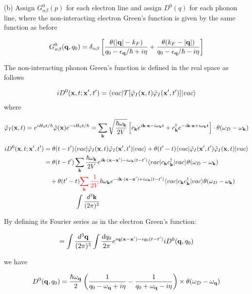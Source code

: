 \noindent (b) Assign $G_{\alpha\beta}^0(p)$ for each electron line and assign $D^0(q)$ for each phonon line, where the non-interacting electron Green's function is given by the same function as before

\[G_{\alpha\beta}^0({\bf q},q_0) = \delta_{\alpha\beta}\left[\frac{\theta(|{\bf q}|-k_F)}{q_0-\epsilon_{\bf q}/\hbar+i\eta} + \frac{\theta(k_F - |{\bf q}|)}{q_0-\epsilon_{\bf q}/\hbar-i\eta}\right] \]

The non-interacting phonon Green's function is defined in the real space as follows

\[iD^0({\bf x},t;{\bf x'},t') = \langle vac|\mathcal{T}[\hat\varphi_I({\bf x},t)\hat\varphi_I({\bf x'},t')]|vac\rangle \]
where

\[\hat\varphi_I({\bf x},t) = e^{iH_0t/\hbar}\hat\varphi({\bf x})e^{-iH_0t/\hbar} = \sum_{\bf k}\sqrt{\frac{\hbar\omega_{\bf k}}{2V}}\left[c_{\bf k}e^{i{\bf k\cdot x} - i\omega_{\bf k}t} + c_{\bf k}^\dagger e^{-i{\bf k\cdot x} + i\omega_{\bf k}t}\right] \cdot\theta(\omega_D-\omega_{\bf k})\]

\[\begin{split}
iD^0({\bf x},t;{\bf x'},t') &= \theta(t-t')\langle vac|\hat\varphi_I({\bf x},t)\hat\varphi_I({\bf x'},t')|vac\rangle + \theta(t'-t)\langle vac|\hat\varphi_I({\bf x'},t')\hat\varphi_I({\bf x},t)|vac\rangle\\
&= \theta(t-t')\sum_{\bf k}\frac{\hbar\omega_{\bf k}}{2V}e^{i{\bf k\cdot(x-x')}-i\omega_{\bf k}(t-t')}\langle vac|c_{\bf k}c_{\bf k}^\dagger|vac\rangle\theta(\omega_D-\omega_{\bf k})\\
&\ \ \  + \theta(t'-t){\color{red}{\sum_{\bf k}\frac{1}{2V}}}\hbar\omega_{\bf k}e^{-i{\bf k\cdot(x-x')}+i\omega_{\bf k}(t-t')}\langle vac|c_{\bf k}c_{\bf k}^\dagger|vac\rangle\theta(\omega_D-\omega_{\bf k})\\
&\quad\quad\quad\quad\quad\int \frac{d^3\bf k}{(2\pi)^3}\\
\end{split} \]

By defining its Fourier series as in the electron Green's function:

\[=\int \frac{d^3\bf q}{(2\pi)^3}\int \frac{d q_0}{2\pi}e^{i{\bf q(x-x')}-iq_0(t-t')}iD^0({\bf q},q_0) \]

we have

\[D^0({\bf q},q_0)=\frac{\hbar\omega_{\bf q}}{2}\left(\frac{1}{q_0-\omega_{\bf q}+i\eta}-\frac{1}{q_0+\omega_{\bf q}-i\eta}\right)\times\theta(\omega_D-\omega_{\bf q}) \]


